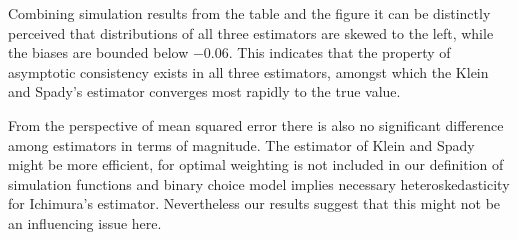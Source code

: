 \documentclass[a4paper]{article}
\begin{document}
Combining simulation results from the table and the figure it can be distinctly perceived that distributions of all three estimators are skewed to the left, while the biases are bounded below $-0.06$. This indicates that the property of asymptotic consistency exists in all three estimators, amongst which the Klein and Spady's estimator converges most rapidly to the true value. 

From the perspective of mean squared error there is also no significant difference among estimators in terms of magnitude. The estimator of Klein and Spady might be more efficient, for optimal weighting is not included in our definition of simulation functions and binary choice model implies necessary heteroskedasticity for Ichimura's estimator. Nevertheless our results suggest that this might not be an influencing issue here. 
\end{document}
